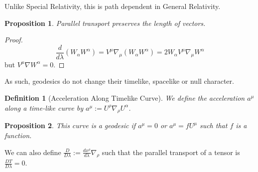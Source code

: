 \documentclass[a4paper]{article}
\theoremstyle{new}
\newtheorem{defi}{Definition}[section]
\newtheorem{prop}{Proposition}[section]
\begin{document}
Unlike Special Relativity, this is path dependent in General Relativity.
\begin{prop}
Parallel transport preserves the length of vectors.
\end{prop}
\begin{proof}
$$\frac{d}{d\lambda}(W_\alpha W^\alpha)=V^\mu\nabla_\mu(W_\alpha W^\alpha)=2W_\alpha V^\mu\nabla_\mu W^\alpha$$
but $V^\mu\nabla W^\alpha=0$.
\end{proof}
As such, geodesics do not change their timelike, spacelike or null character.
\begin{defi}[Acceleration Along Timelike Curve]
We define the acceleration $a^\mu$ along a time-like curve by $a^\mu:=U^\rho\nabla_\rho U^\alpha$.
\end{defi}
\begin{prop}
This curve is a geodesic if $a^\mu=0$ or $a^\mu=fU^\mu$ such that $f$ is a function.
\end{prop}
We can also define $\frac{D}{D\lambda}:=\frac{d x^\rho}{d\lambda}\nabla_\rho$ such that the parallel transport of a tensor is $\frac{DT}{D\lambda}=0$.
\newpage
\end{document}
